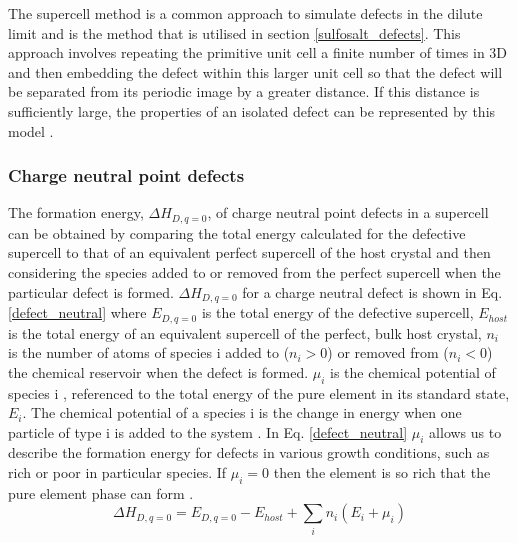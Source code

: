 \documentclass[11pt, twoside]{report}
\begin{document}
The supercell method is a common approach to simulate defects in the dilute limit and is the method that is utilised in section \ref{sulfosalt_defects}. This approach involves repeating the primitive unit cell a finite number of times in 3D and then embedding the defect within this larger unit cell so that the defect will be separated from its periodic image by a greater distance. If this distance is sufficiently large, the properties of an isolated defect can be represented by this model \cite{freysoldt_rev}.

\subsubsection{Charge neutral point defects}
The formation energy, $\Delta H_{D,q=0}$, of charge neutral point defects in a supercell can be obtained by comparing the total energy calculated for the defective supercell to that of an equivalent perfect supercell of the host crystal and then considering the species added to or removed from the perfect supercell when the particular defect is formed. $\Delta H_{D,q=0}$ for a charge neutral defect is shown in Eq. \ref{defect_neutral} where $E_{D,q=0}$ is the total energy of the defective supercell, $E_{host}$ is the total energy of an equivalent supercell of the perfect, bulk host crystal, $n_i$ is the number of atoms of species i added to ($n_i > 0 $) or removed from ($n_i < 0$) the chemical reservoir when the defect is formed. $\mu_i$ is the chemical potential of species i \cite{ZhangNorthup_defect_formation}, referenced to the total energy of the pure element in its standard state, $E_i$. The chemical potential of a species i is the change in energy when one particle of type i is added to the system \cite{chem_pot}. In Eq. \ref{defect_neutral} $\mu_i$ allows us to describe the formation energy for defects in various growth conditions, such as rich or poor in particular species. If $\mu_i = 0$ then the element is so rich that the pure element phase can form \cite{defects_Chen}.
\begin{equation}\label{defect_neutral}
\Delta H_{D,q=0} = E_{D,q=0} - E_{host} + \sum_i n_i (E_i + \mu_i )
\end{equation}
\end{document}
